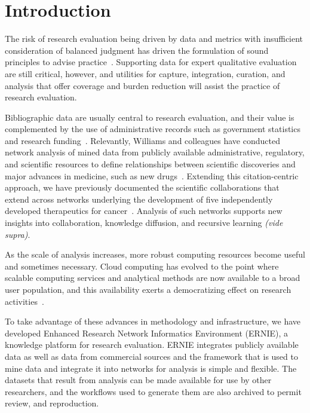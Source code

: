 \documentclass[review]{elsarticle}
\begin{document}
\linenumbers
\raggedright

\section*{Introduction}

The risk of research evaluation being driven by data and metrics with insufficient consideration of balanced judgment has driven the formulation of  sound principles to advise practice~\cite{LeidenManifesto2015}. Supporting data for expert qualitative evaluation are still critical, however, and utilities for capture, integration, curation, and analysis that offer coverage and burden reduction will assist the practice of research evaluation. 

Bibliographic data are usually central to research evaluation, and their value is complemented by the use of administrative records such as government statistics and research funding~\cite{FedStat2017}. 
Relevantly, Williams and colleagues have conducted network analysis of mined data from publicly available administrative, regulatory, and scientific resources to define relationships between scientific discoveries and major advances in medicine, such as new drugs~\cite{Williams2015}. 
Extending this citation-centric approach, we have previously documented the scientific collaborations that extend across networks underlying the development of five independently developed therapeutics for cancer~\cite{Keserci2017}. 
Analysis of such networks supports new insights into collaboration, knowledge diffusion, and recursive learning \textit{(vide supra)}. 

As the scale of analysis increases, more robust computing resources become useful and sometimes necessary. Cloud computing has evolved to the point where scalable computing services and analytical methods are now available to a broad user population, and this availability exerts a democratizing effect on research activities~\cite{Barga2011}. 

To take advantage of these advances in methodology and infrastructure, we have developed Enhanced Research Network Informatics Environment (ERNIE), a knowledge platform for research evaluation. ERNIE integrates publicly available data as well as data from commercial sources and the framework that is used to mine data and integrate it into networks for analysis is simple and flexible. The datasets that result from analysis can be made available for use by other researchers, and the workflows used to generate them are also archived to permit  review, and reproduction. 
 
\end{document}
